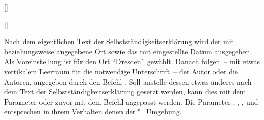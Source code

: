 \begin{Declaration*}{}
\begin{Declaration*}{}
\begin{Declaration*}{}
\begin{Declaration}{[]}
\begin{Declaration}[v2.05]{[\LParameter]}
\begin{Declaration}{}
\begin{Declaration}{}
\begin{Declaration}{}
\begin{Declaration}{}
\begin{Declaration}[v2.02]{}
\begin{Declaration}[v2.02]{%
}
\begin{Declaration}[v2.02]{%
}
\begin{Declaration}{}
Nach dem eigentlichen Text der Selbstständigkeitserklärung wird der mit 
 beziehungsweise  angegebene Ort 
sowie das mit  eingestellte Datum ausgegeben. Als Voreinstellung 
ist für den Ort \enquote{Dresden} gewählt. Danach folgen~-- mit etwas 
vertikalem Leerraum für die notwendige Unterschrift~-- der Autor oder die 
Autoren, angegeben durch den Befehl . Soll anstelle dessen etwas 
anderes nach dem Text der Selbstständigkeitserklärung gesetzt werden, kann dies 
mit dem Parameter  oder zuvor mit dem 
Befehl  angepasst werden. Die Parameter 
, 
, 
, 
 und 
 entsprechen in ihrem Verhalten denen 
der "=Umgebung.
\end{Declaration}
\end{Declaration}
\end{Declaration}
\end{Declaration}
\end{Declaration}
\end{Declaration}
\end{Declaration}
\end{Declaration}
\end{Declaration}
\end{Declaration}


\end{Declaration*}
\end{Declaration*}
\end{Declaration*}
